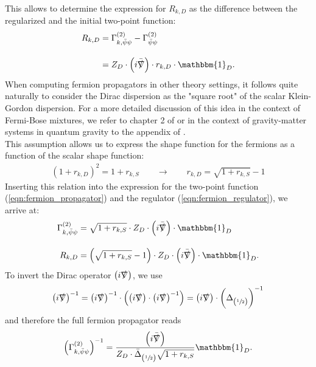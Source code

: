 This allows to determine the expression for $R_{k, D}$ as the difference between the regularized and the initial two-point function:
\begin{equation}
\begin{aligned}
	R_{k,D} &= \Gamma^{(2)}_{k, \bar{\psi}\psi} - \Gamma^{(2)}_{\bar{\psi}\psi} \\[10pt]
	&= Z_D\cdot\left(i\bar{\slashed{\nabla}}\right)\cdot r_{k,D} \cdot\mathbbm{1}_D. \label{eqn:fermion_regulator}
\end{aligned}
\end{equation}
When computing fermion propagators in other theory settings, it follows quite naturally to consider the Dirac dispersion as the "square root" of the scalar Klein-Gordon dispersion. For a more detailed discussion of this idea in the context of Fermi-Bose mixtures, we refer to chapter 2 of \cite{PawlowskiNPgaugeLecture} or in the context of gravity-matter systems in quantum gravity to the appendix of \cite{BritoHamadaPereiraYamada2019}. \\
This assumption allows us to express the shape function for the fermions as a function of the scalar shape function:
\begin{align}
\left(1+r_{k,D}\right)^2 = 1+r_{k,S} \qquad \longrightarrow \qquad r_{k, D} = \sqrt{1+r_{k,S}} - 1
\end{align}
Inserting this relation into the expression for the two-point function (\ref{eqn:fermion_propagator}) and the regulator (\ref{eqn:fermion_regulator}), we arrive at:
\begin{equation}
\begin{aligned}
	\Gamma^{(2)}_{k, \bar{\psi}\psi} &=\sqrt{1+r_{k,S}}\cdot Z_D\cdot\left(i\bar{\slashed{\nabla}}\right)\cdot\mathbbm{1}_D \\[10pt] 
	R_{k,D} &= \left(\sqrt{1+r_{k,S}} -1 \right)\cdot Z_D\cdot\left(i\bar{\slashed{\nabla}}\right)\cdot\mathbbm{1}_D.
\end{aligned}
\end{equation}
To invert the Dirac operator $\left(i\slashed{\nabla}\right)$, we use
\begin{equation}
	\left(i\slashed{\nabla}\right)^{-1} =\left(i\slashed{\nabla}\right)^{-1}\cdot\left(\left(i\slashed{\nabla}\right)\cdot\left(i\slashed{\nabla}\right)^{-1}\right) = \left(i\slashed{\nabla}\right)\cdot\left(\Delta_{\left(\sfrac{1}{2}\right)}\right)^{-1}
\end{equation}
and therefore the full fermion propagator reads
\begin{equation}
	\left(\Gamma^{(2)}_{k, \bar{\psi}\psi} \right)^{-1} = \frac{\left(i\bar{\slashed{\nabla}}\right)}{Z_D\cdot\bar{\Delta}_{\left(\sfrac{1}{2}\right)}\sqrt{1+r_{k,S}}}\mathbbm{1}_D.
\end{equation}
